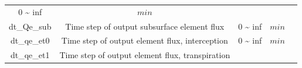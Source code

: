 \documentclass[]{scrbook}
\begin{document}
\begin{longtable}[]{@{}ccccc@{}}
\begin{minipage}[t]{0.10\columnwidth}
0 \textasciitilde{} inf\strut
\end{minipage} & \begin{minipage}[t]{0.10\columnwidth}\centering\strut
\(min\)\strut
\end{minipage} & \begin{minipage}[t]{0.26\columnwidth}\centering\strut
\strut
\end{minipage}\tabularnewline
\begin{minipage}[t]{0.17\columnwidth}\centering\strut
dt\_Qe\_sub\strut
\end{minipage} & \begin{minipage}[t]{0.23\columnwidth}\centering\strut
Time step of output subsurface element flux\strut
\end{minipage} & \begin{minipage}[t]{0.10\columnwidth}\centering\strut
0 \textasciitilde{} inf\strut
\end{minipage} & \begin{minipage}[t]{0.10\columnwidth}\centering\strut
\(min\)\strut
\end{minipage} & \begin{minipage}[t]{0.26\columnwidth}\centering\strut
\strut
\end{minipage}\tabularnewline
\begin{minipage}[t]{0.17\columnwidth}\centering\strut
dt\_qe\_et0\strut
\end{minipage} & \begin{minipage}[t]{0.23\columnwidth}\centering\strut
Time step of output element flux, interception\strut
\end{minipage} & \begin{minipage}[t]{0.10\columnwidth}\centering\strut
0 \textasciitilde{} inf\strut
\end{minipage} & \begin{minipage}[t]{0.10\columnwidth}\centering\strut
\(min\)\strut
\end{minipage} & \begin{minipage}[t]{0.26\columnwidth}\centering\strut
\strut
\end{minipage}\tabularnewline
\begin{minipage}[t]{0.17\columnwidth}\centering\strut
dt\_qe\_et1\strut
\end{minipage} & \begin{minipage}[t]{0.23\columnwidth}\centering\strut
Time step of output element flux, transpiration\strut
\end{minipage} & \begin{minipage}[t]{0.10\columnwidth}\centering\strut

\end{minipage}
\end{longtable}
\end{document}
